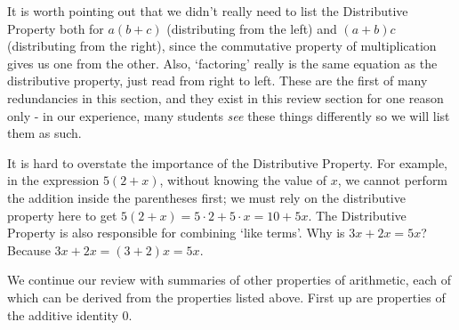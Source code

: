 
It is worth pointing out that we didn't really need to list the Distributive Property both for $a(b+c)$ (distributing from the left) and $(a+b)c$ (distributing from the right), since the commutative property of multiplication gives us one from the other.  Also, `factoring' really is the same equation as the distributive property, just read from right to left. These are the first of many redundancies in this section, and they exist in this review section for one reason only - in our experience, many students \textit{see} these things differently so we will list them as such.   

\smallskip

It is hard to overstate the importance of the Distributive Property.  For example, in the expression $5(2+x)$, without knowing the value of $x$, we cannot perform the addition inside the parentheses first;  we must rely on the distributive property here to get  $5(2+x) = 5\cdot 2 + 5 \cdot x = 10 + 5x$.  The Distributive Property is also responsible for combining `like terms'.  Why is $3x + 2x = 5x$?  Because  $3x + 2x = (3+2)x = 5x$.  

\smallskip

We continue our review with summaries of other properties of arithmetic, each of which can be derived from the properties listed above.  First up are properties of the additive identity $0$.

\medskip


